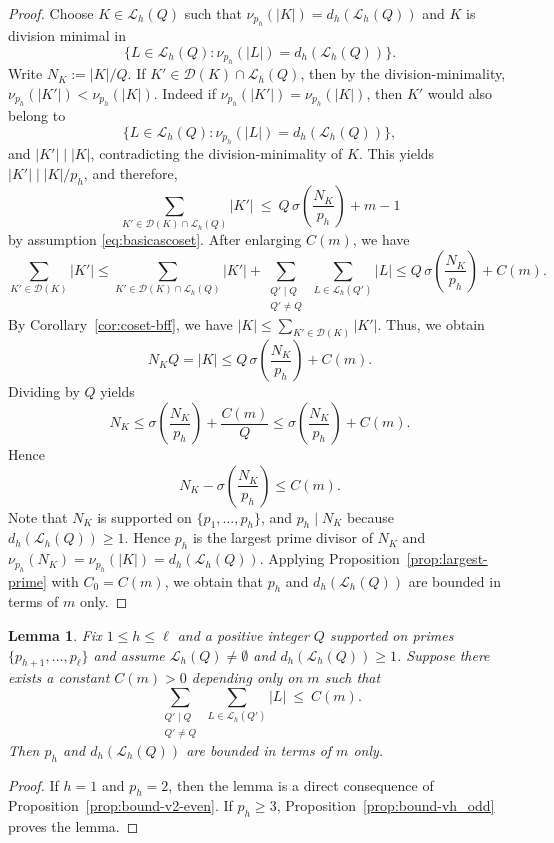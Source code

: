 \documentclass[11pt,reqno]{amsart}
\newtheorem{lemma}[theorem]{Lemma}
\theoremstyle{definition}
\newcommand{\Lset}{\mathcal{L}}
\newcommand{\Dset}{\mathcal{D}}
\begin{document}
\begin{proof}
Choose \(K\in\Lset_h(Q)\) such that \(
\nu_{p_h}(|K|)=d_h(\Lset_h(Q))
\)
and \(K\) is division minimal in
\[\{L\in\Lset_h(Q):\nu_{p_h}(|L|)=d_h(\Lset_h(Q))\}.
\]
Write \(N_K:=|K|/Q\). If \(K'\in\Dset(K)\cap\Lset_h(Q)\), then by the division-minimality,
\(\nu_{p_h}(|K'|)<\nu_{p_h}(|K|)\). Indeed if \(\nu_{p_h}(|K'|)=\nu_{p_h}(|K|)\), then \(K'\) would also belong to
\[
\{L\in\Lset_h(Q):\nu_{p_h}(|L|)=d_h(\Lset_h(Q))\},
\]
and \(|K'|\mid |K|\), contradicting the division-minimality of \(K\). This yields \(|K'|\mid |K|/p_h\), and therefore,
\[
\sum_{K'\in\Dset(K)\cap\Lset_h(Q)} |K'|
\ \le\
Q\,\sigma\!\left(\frac{N_K}{p_h}\right) + m - 1
\]
by assumption \eqref{eq:basicascoset}. After enlarging \(C(m)\), we have
\[
\sum_{K'\in\Dset(K)} |K'|
\le
\sum_{K'\in\Dset(K)\cap\Lset_h(Q)} |K'|+ \sum_{\substack{Q'\mid Q\\ Q'\neq Q}}\ \sum_{L\in\Lset_h(Q')} |L|
\le
Q\,\sigma\!\left(\frac{N_K}{p_h}\right)+C(m).
\]
By Corollary~\ref{cor:coset-bff}, we have \(|K|\le \sum_{K'\in\Dset(K)} |K'|\). Thus, we obtain
\[
N_KQ = |K| \le
Q\,\sigma\!\left(\frac{N_K}{p_h}\right)+C(m).
\]
Dividing by \(Q\) yields
\[
N_K\le \sigma\!\left(\frac{N_K}{p_h}\right)+\frac{C(m)}{Q}
\le \sigma\!\left(\frac{N_K}{p_h}\right)+C(m).
\]
Hence
\[
N_K-\sigma\!\left(\frac{N_K}{p_h}\right)\le C(m).
\]
Note that \(N_K\) is supported on \(\{p_1,\dots,p_h\}\),
and \(p_h\mid N_K\) because \(d_h(\Lset_h(Q))\ge1\).
Hence \(p_h\) is the largest prime divisor of \(N_K\) and \(\nu_{p_h}(N_K)=\nu_{p_h}(|K|)=d_h(\Lset_h(Q))\).
Applying Proposition~\ref{prop:largest-prime} with \(C_0=C(m)\),
we obtain that \(p_h\) and \(d_h(\Lset_h(Q))\) are bounded in terms of \(m\) only.
\end{proof}

\begin{lemma}\label{lem:bound-vh-general}
Fix \(1\le h\le \ell\) and a positive integer \(Q\) supported on primes \(\{p_{h+1},\dots,p_\ell\}\) and assume \(\Lset_h(Q)\neq\emptyset\) and \(d_h(\Lset_h(Q))\ge 1\). Suppose there exists a constant \(C(m)>0\) depending only on \(m\) such that
\[ \sum_{\substack{Q'\mid Q\\ Q'\neq Q}}\ \sum_{L\in\Lset_h(Q')} |L|\ \le\ C(m). \]
Then \(p_h\) and \(d_h(\Lset_h(Q))\) are bounded in terms of \(m\) only.
\end{lemma}

\begin{proof}
If \(h = 1\) and \(p_h = 2\), then the lemma is a direct consequence of Proposition~\ref{prop:bound-v2-even}. If \(p_h \ge 3\), Proposition~\ref{prop:bound-vh_odd} proves the lemma.
\end{proof}
\end{document}
